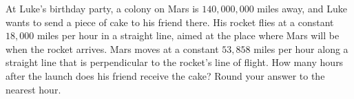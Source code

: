 At Luke's birthday party, a colony on Mars is $140{,}000{,}000$ miles away, and Luke wants to send a piece of cake to his friend there. His rocket flies at a constant $18{,}000$ miles per hour in a straight line, aimed at the place where Mars will be when the rocket arrives. Mars moves at a constant $53{,}858$ miles per hour along a straight line that is perpendicular to the rocket's line of flight. How many hours after the launch does his friend receive the cake? Round your answer to the nearest hour.
